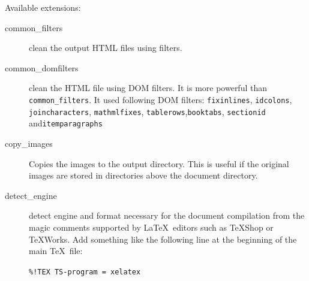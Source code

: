 Available extensions:

\begin{description}
\item[common\_filters]
clean the output HTML files using filters.
\item[common\_domfilters]
clean the HTML file using DOM filters. It is more powerful than
\texttt{common\_filters}. It used following DOM filters:
\texttt{fixinlines}, \texttt{idcolons}, \texttt{joincharacters},
\texttt{mathmlfixes}, \texttt{tablerows},\texttt{booktabs},
\texttt{sectionid} and\texttt{itemparagraphs}
\item[copy\_images]
Copies the images to the output directory. This is useful if the
original images are stored in directories above the document directory.
\item[detect\_engine]
detect engine and format necessary for the document compilation from the
magic comments supported by \LaTeX~editors such as TeXShop or TeXWorks.
Add something like the following line at the beginning of the main
\TeX~file:

\texttt{\%!TEX\ TS-program\ =\ xelatex}


\end{description}
